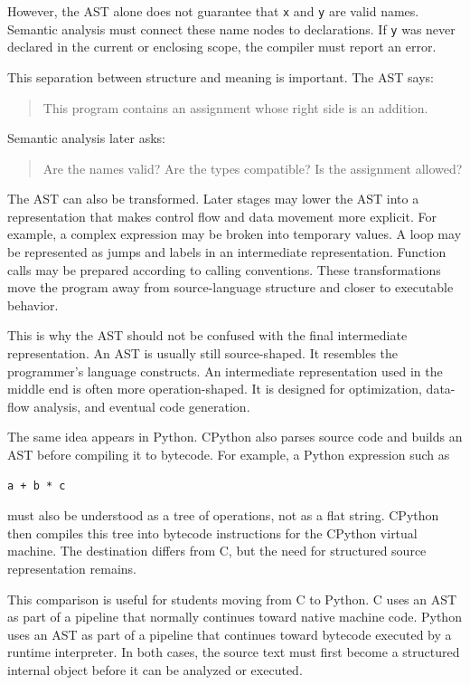 However, the AST alone does not guarantee that \texttt{x} and \texttt{y} are valid names. Semantic analysis must connect these name nodes to declarations. If \texttt{y} was never declared in the current or enclosing scope, the compiler must report an error.

This separation between structure and meaning is important. The AST says:

\begin{quote}
This program contains an assignment whose right side is an addition.
\end{quote}

Semantic analysis later asks:

\begin{quote}
Are the names valid? Are the types compatible? Is the assignment allowed?
\end{quote}

The AST can also be transformed. Later stages may lower the AST into a representation that makes control flow and data movement more explicit. For example, a complex expression may be broken into temporary values. A loop may be represented as jumps and labels in an intermediate representation. Function calls may be prepared according to calling conventions. These transformations move the program away from source-language structure and closer to executable behavior.

This is why the AST should not be confused with the final intermediate representation. An AST is usually still source-shaped. It resembles the programmer's language constructs. An intermediate representation used in the middle end is often more operation-shaped. It is designed for optimization, data-flow analysis, and eventual code generation.

The same idea appears in Python. CPython also parses source code and builds an AST before compiling it to bytecode. For example, a Python expression such as

\begin{verbatim}
a + b * c
\end{verbatim}

must also be understood as a tree of operations, not as a flat string. CPython then compiles this tree into bytecode instructions for the CPython virtual machine. The destination differs from C, but the need for structured source representation remains.

This comparison is useful for students moving from C to Python. C uses an AST as part of a pipeline that normally continues toward native machine code. Python uses an AST as part of a pipeline that continues toward bytecode executed by a runtime interpreter. In both cases, the source text must first become a structured internal object before it can be analyzed or executed.

